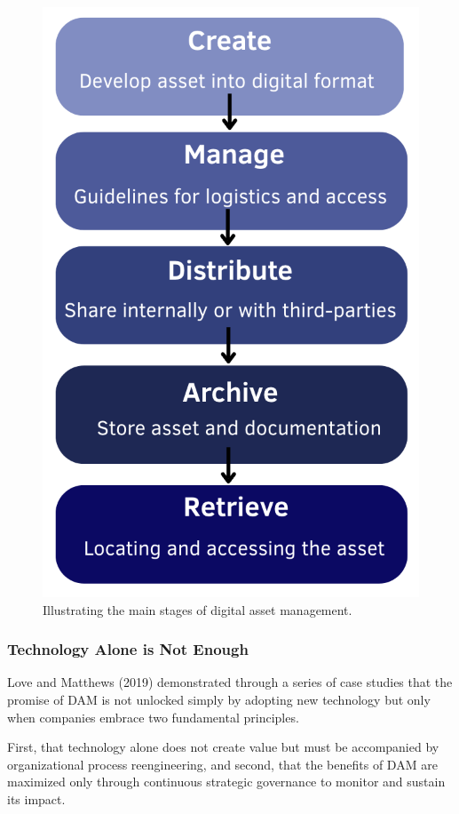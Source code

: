 \documentclass[a4paper,12pt,twocolumn]{article}
\numberwithin{figure}{section}
\numberwithin{table}{section}
\begin{document}
\begin{figure}[h]
    \centering
    \includegraphics[width=0.9\linewidth]{4steg.png}  %
    \caption{Illustrating the main stages of digital asset management.}
    \label{fig:4steg}  
\end{figure}

\vspace{0.3cm}
\subsubsection{Technology Alone is Not Enough}

Love and Matthews (2019) demonstrated through a series of case studies that the promise of DAM
is not unlocked simply by adopting new technology but only when companies embrace two 
fundamental principles.

First, that technology alone does not create value but must be accompanied by organizational process reengineering, and second, that the benefits of DAM are maximized only through continuous strategic governance to monitor and sustain its impact.
\end{document}

